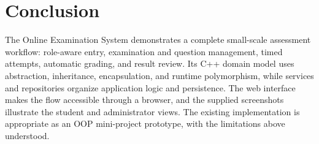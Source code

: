 \documentclass[12pt,a4paper,oneside]{book}
\begin{document}
\section{Conclusion}
The Online Examination System demonstrates a complete small-scale assessment workflow: role-aware entry, examination and question management, timed attempts, automatic grading, and result review. Its C++ domain model uses abstraction, inheritance, encapsulation, and runtime polymorphism, while services and repositories organize application logic and persistence. The web interface makes the flow accessible through a browser, and the supplied screenshots illustrate the student and administrator views. The existing implementation is appropriate as an OOP mini-project prototype, with the limitations above understood.
\end{document}
